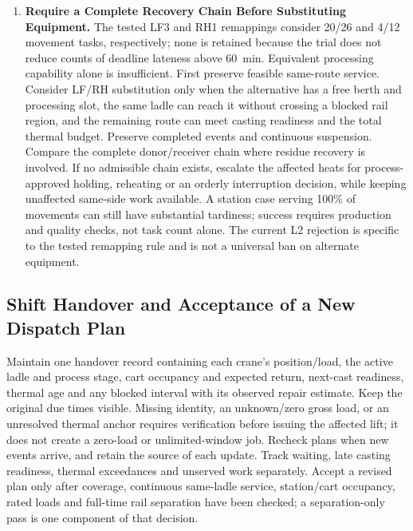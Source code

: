 \documentclass[11pt,a4paper]{article}
\begin{document}
\begin{enumerate}[leftmargin=1.5em,itemsep=5pt]
  \item \textbf{Require a Complete Recovery Chain Before Substituting Equipment.}
  The tested LF3 and RH1 remappings consider 20/26 and 4/12 movement tasks, respectively; none is retained because the trial does not reduce counts of deadline lateness above 60~min. Equivalent processing capability alone is insufficient. First preserve feasible same-route service. Consider LF/RH substitution only when the alternative has a free berth and processing slot, the same ladle can reach it without crossing a blocked rail region, and the remaining route can meet casting readiness and the total thermal budget. Preserve completed events and continuous suspension. Compare the complete donor/receiver chain where residue recovery is involved. If no admissible chain exists, escalate the affected heats for process-approved holding, reheating or an orderly interruption decision, while keeping unaffected same-side work available. A station case serving 100\% of movements can still have substantial tardiness; success requires production and quality checks, not task count alone. The current L2 rejection is specific to the tested remapping rule and is not a universal ban on alternate equipment.
\end{enumerate}

\subsection{Shift Handover and Acceptance of a New Dispatch Plan}
Maintain one handover record containing each crane's position/load, the active ladle and process stage, cart occupancy and expected return, next-cast readiness, thermal age and any blocked interval with its observed repair estimate. Keep the original due times visible. Missing identity, an unknown/zero gross load, or an unresolved thermal anchor requires verification before issuing the affected lift; it does not create a zero-load or unlimited-window job. Recheck plans when new events arrive, and retain the source of each update. Track waiting, late casting readiness, thermal exceedances and unserved work separately. Accept a revised plan only after coverage, continuous same-ladle service, station/cart occupancy, rated loads and full-time rail separation have been checked; a separation-only pass is one component of that decision.
\end{document}
